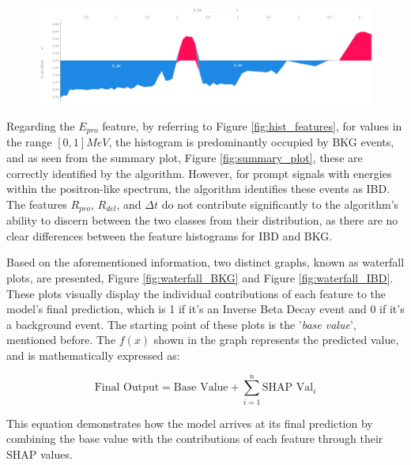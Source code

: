 \begin{figure}[h!]
	\centering
	\includegraphics[width=\linewidth]{Images/Shap/E_del_force_plot.png}
	\label{fig:E_del_force_plot}
\end{figure}

Regarding the $E_{pro}$ feature, by referring to Figure \ref{fig:hist_features}, for values in the range $[0, 1] MeV$, the histogram is predominantly occupied by BKG events, and as seen from the summary plot, Figure \ref{fig:summary_plot}, these are correctly identified by the algorithm. However, for prompt signals with energies within the positron-like spectrum, the algorithm identifies these events as IBD. The features $R_{pro}$, $R_{del}$, and $\Delta t$ do not contribute significantly to the algorithm's ability to discern between the two classes from their distribution, as there are no clear differences between the feature histograms for IBD and BKG.


Based on the aforementioned information, two distinct graphs, known as waterfall plots, are presented, Figure \ref{fig:waterfall_BKG} and Figure \ref{fig:waterfall_IBD}. These plots visually display the individual contributions of each feature to the model's final prediction, which is 1 if it's an Inverse Beta Decay event and 0 if it's a background event. The starting point of these plots is the '\textit{base value}', mentioned before. The $f(x)$ shown in the graph represents the predicted value, and is mathematically expressed as:

\begin{equation}
	\text{Final Output} = \text{Base Value} + \sum_{i=1}^{n} \text{SHAP Val}_{i}
\end{equation}

This equation demonstrates how the model arrives at its final prediction by combining the base value with the contributions of each feature through their SHAP values.


